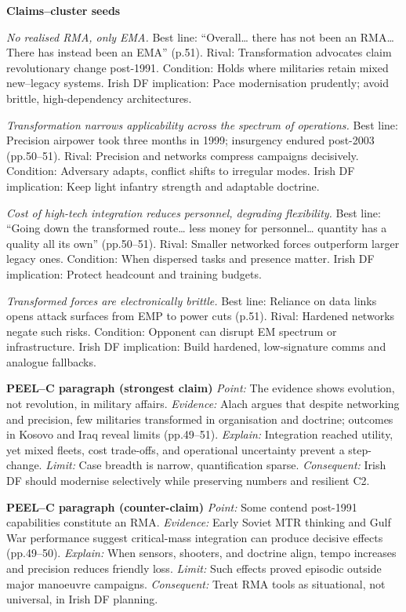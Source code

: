 \textbf{Claims–cluster seeds}

\textit{No realised RMA, only EMA.} Best line: “Overall… there has not been an RMA… There has instead been an EMA” (p.51). Rival: Transformation advocates claim revolutionary change post-1991. Condition: Holds where militaries retain mixed new–legacy systems. Irish DF implication: Pace modernisation prudently; avoid brittle, high-dependency architectures.

\textit{Transformation narrows applicability across the spectrum of operations.} Best line: Precision airpower took three months in 1999; insurgency endured post-2003 (pp.50–51). Rival: Precision and networks compress campaigns decisively. Condition: Adversary adapts, conflict shifts to irregular modes. Irish DF implication: Keep light infantry strength and adaptable doctrine.

\textit{Cost of high-tech integration reduces personnel, degrading flexibility.} Best line: “Going down the transformed route… less money for personnel… quantity has a quality all its own” (pp.50–51). Rival: Smaller networked forces outperform larger legacy ones. Condition: When dispersed tasks and presence matter. Irish DF implication: Protect headcount and training budgets.

\textit{Transformed forces are electronically brittle.} Best line: Reliance on data links opens attack surfaces from EMP to power cuts (p.51). Rival: Hardened networks negate such risks. Condition: Opponent can disrupt EM spectrum or infrastructure. Irish DF implication: Build hardened, low-signature comms and analogue fallbacks.

\textbf{PEEL–C paragraph (strongest claim)}
\textit{Point:} The evidence shows evolution, not revolution, in military affairs.
\textit{Evidence:} Alach argues that despite networking and precision, few militaries transformed in organisation and doctrine; outcomes in Kosovo and Iraq reveal limits (pp.49–51).
\textit{Explain:} Integration reached utility, yet mixed fleets, cost trade-offs, and operational uncertainty prevent a step-change.
\textit{Limit:} Case breadth is narrow, quantification sparse.
\textit{Consequent:} Irish DF should modernise selectively while preserving numbers and resilient C2.

\textbf{PEEL–C paragraph (counter-claim)}
\textit{Point:} Some contend post-1991 capabilities constitute an RMA.
\textit{Evidence:} Early Soviet MTR thinking and Gulf War performance suggest critical-mass integration can produce decisive effects (pp.49–50).
\textit{Explain:} When sensors, shooters, and doctrine align, tempo increases and precision reduces friendly loss.
\textit{Limit:} Such effects proved episodic outside major manoeuvre campaigns.
\textit{Consequent:} Treat RMA tools as situational, not universal, in Irish DF planning.



